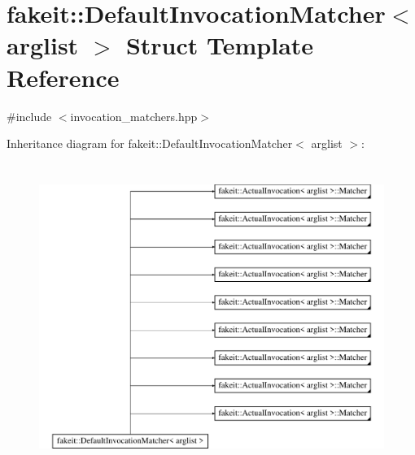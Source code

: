 \hypertarget{structfakeit_1_1DefaultInvocationMatcher}{}\section{fakeit\+::Default\+Invocation\+Matcher$<$ arglist $>$ Struct Template Reference}
\label{structfakeit_1_1DefaultInvocationMatcher}


{\ttfamily \#include $<$invocation\+\_\+matchers.\+hpp$>$}

Inheritance diagram for fakeit\+::Default\+Invocation\+Matcher$<$ arglist $>$\+:\begin{figure}[H]
\begin{center}
\leavevmode
\includegraphics[height=10.000000cm]{structfakeit_1_1DefaultInvocationMatcher}
\end{center}
\end{figure}
